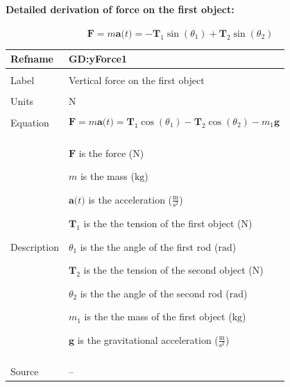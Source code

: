 \documentclass[12pt]{article}
\begin{document}
\paragraph{Detailed derivation of force on the first object:}
\label{GD:xForce1Deriv}
\begin{displaymath}
\symbf{F}=m \symbf{a}\text{(}t\text{)}=-{\symbf{T}_{1}} \sin\left({θ_{1}}\right)+{\symbf{T}_{2}} \sin\left({θ_{2}}\right)
\end{displaymath}
\vspace{\baselineskip}
\noindent
\begin{minipage}{\textwidth}
\begin{tabular}{>{\raggedright}p{}>{\raggedright\arraybackslash}p{}}
\toprule \textbf{Refname} & \textbf{GD:yForce1}
\label{GD:yForce1}
\\ \midrule \\
Label & Vertical force on the first object
        
\\ \midrule \\
Units & ${\text{N}}$
        
\\ \midrule \\
Equation & \begin{displaymath}
           \symbf{F}=m \symbf{a}\text{(}t\text{)}={\symbf{T}_{1}} \cos\left({θ_{1}}\right)-{\symbf{T}_{2}} \cos\left({θ_{2}}\right)-{m_{1}} \symbf{g}
           \end{displaymath}
\\ \midrule \\
Description & \begin{symbDescription}
              \item{$\symbf{F}$ is the force (${\text{N}}$)}
              \item{$m$ is the mass (${\text{kg}}$)}
              \item{$\symbf{a}\text{(}t\text{)}$ is the acceleration ($\frac{\text{m}}{\text{s}^{2}}$)}
              \item{${\symbf{T}_{1}}$ is the the tension of the first object (${\text{N}}$)}
              \item{${θ_{1}}$ is the the angle of the first rod (${\text{rad}}$)}
              \item{${\symbf{T}_{2}}$ is the the tension of the second object (${\text{N}}$)}
              \item{${θ_{2}}$ is the the angle of the second rod (${\text{rad}}$)}
              \item{${m_{1}}$ is the the mass of the first object (${\text{kg}}$)}
              \item{$\symbf{g}$ is the gravitational acceleration ($\frac{\text{m}}{\text{s}^{2}}$)}
              \end{symbDescription}
\\ \midrule \\
Source & --
         

\end{tabular}
\end{minipage}
\end{document}
